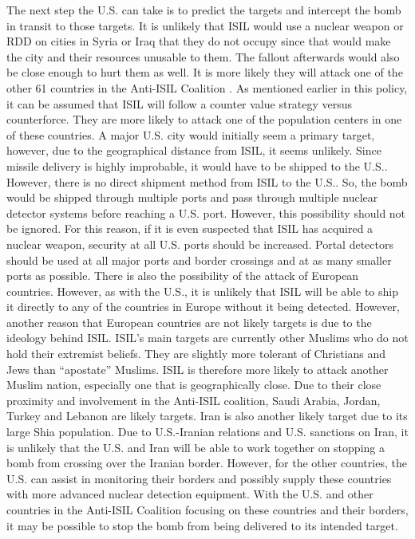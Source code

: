 \documentclass{report}
\begin{document}
The next step the U.S. can take is to predict the targets and intercept the bomb in transit to those targets.  It is unlikely that ISIL would use a nuclear weapon or RDD on cities in Syria or Iraq that they do not occupy since that would make the city and their resources unusable to them.  The fallout afterwards would also be close enough to hurt them as well.  It is more likely they will attack one of the other 61 countries in the Anti-ISIL Coalition \cite{Wordsworth2015}.  As mentioned earlier in this policy, it can be assumed that ISIL will follow a counter value strategy versus counterforce.  They are more likely to attack one of the population centers in one of these countries.  A major U.S. city would initially seem a primary target, however, due to the geographical distance from ISIL, it seems unlikely.  Since missile delivery is highly improbable, it would have to be shipped to the U.S..  However, there is no direct shipment method from ISIL to the U.S..  So, the bomb would be shipped through multiple ports and pass through multiple nuclear detector systems before reaching a U.S. port.  However, this possibility should not be ignored.  For this reason, if it is even suspected that ISIL has acquired a nuclear weapon, security at all U.S. ports should be increased.  Portal detectors should be used at all major ports and border crossings and at as many smaller ports as possible.  There is also the possibility of the attack of European countries.   However, as with the U.S., it is unlikely that ISIL will be able to ship it directly to any of the countries in Europe without it being detected.  However, another reason that European countries are not likely targets is due to the ideology behind ISIL.  ISIL's main targets are currently other Muslims who do not hold their extremist beliefs.  They are slightly more tolerant of Christians and Jews than \enquote{apostate} Muslims. \cite{Wood2015}  ISIL is therefore more likely to attack another Muslim nation, especially one that is geographically close.  Due to their close proximity and involvement in the Anti-ISIL coalition, Saudi Arabia, Jordan, Turkey and Lebanon are likely targets.  Iran is also another likely target due to its large Shia population.  Due to U.S.-Iranian relations and U.S. sanctions on Iran, it is unlikely that the U.S. and Iran will be able to work together on stopping a bomb from crossing over the Iranian border.  However, for the other countries, the U.S. can assist in monitoring their borders and possibly supply these countries with more advanced nuclear detection equipment.  With the U.S. and other countries in the Anti-ISIL Coalition focusing on these countries and their borders, it may be possible to stop the bomb from being delivered to its intended target.
\end{document}
